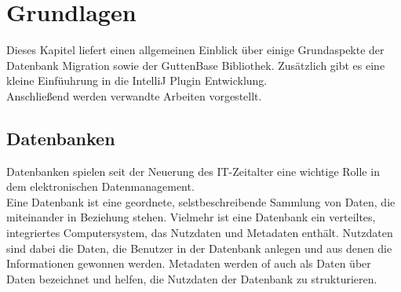 \chapter{Grundlagen}
Dieses Kapitel liefert einen allgemeinen Einblick über einige Grundaspekte der Datenbank Migration sowie der GuttenBase Bibliothek. Zusätzlich gibt es eine kleine Einfüuhrung in die IntelliJ Plugin Entwicklung.\\
Anschließend werden verwandte Arbeiten vorgestellt. 
\section{Datenbanken}
Datenbanken spielen seit der Neuerung des IT-Zeitalter eine wichtige Rolle in dem elektronischen Datenmanagement.\\
Eine Datenbank ist eine geordnete, selstbeschreibende Sammlung von Daten, die miteinander in Beziehung stehen.
Vielmehr ist eine Datenbank ein verteiltes, integriertes Computersystem, das Nutzdaten und Metadaten enthält. Nutzdaten sind dabei die Daten, die Benutzer in der Datenbank anlegen und aus denen die Informationen gewonnen werden. Metadaten werden of auch als Daten über Daten bezeichnet und helfen, die Nutzdaten der Datenbank zu strukturieren. 
	
	
	
